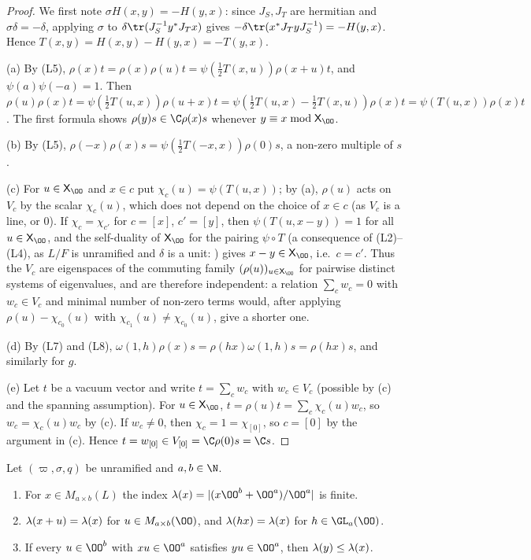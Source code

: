 \begin{proof}
We first note $\sigma H(x,y)=-H(y,x)$: since $J_S,J_T$ are hermitian and $\sigma\delta=-\delta$, applying $\sigma$ to
$\delta\tr(J_S^{-1}y^*J_Tx)$ gives $-\delta\tr(x^*J_TyJ_S^{-1})=-H(y,x)$. Hence $T(x,y)=H(x,y)-H(y,x)=-T(y,x)$.

(a) By (L5), $\rho(x)t=\rho(x)\rho(u)t=\psi(\frac12T(x,u))\rho(x+u)t$, and $\psi(a)\psi(-a)=1$. Then
$\rho(u)\rho(x)t=\psi(\frac12T(u,x))\rho(u+x)t=\psi(\frac12T(u,x)-\frac12T(x,u))\rho(x)t=\psi(T(u,x))\rho(x)t$. The first formula shows
$\rho(y)s\in\C\rho(x)s$ whenever $y\equiv x\bmod\shmiscXO$.

(b) By (L5), $\rho(-x)\rho(x)s=\psi(\frac12T(-x,x))\rho(0)s$, a non-zero multiple of $s$.

(c) For $u\in\shmiscXO$ and $x\in c$ put $\chi_c(u)=\psi(T(u,x))$; by (a), $\rho(u)$ acts on $V_c$ by the scalar $\chi_c(u)$, which does not
depend on the choice of $x\in c$ (as $V_c$ is a line, or $0$). If $\chi_c=\chi_{c'}$ for $c=[x]$, $c'=[y]$, then $\psi(T(u,x-y))=1$ for all
$u\in\shmiscXO$, and the self-duality of $\shmiscXO$ for the pairing $\psi\circ T$ (a consequence of (L2)--(L4), as $L/F$ is unramified
and $\delta$ is a unit: ) gives $x-y\in\shmiscXO$, i.e.\ $c=c'$. Thus the $V_c$ are eigenspaces of
the commuting family $(\rho(u))_{u\in\shmiscXO}$ for pairwise distinct systems of eigenvalues, and are therefore independent: a relation
$\sum_cw_c=0$ with $w_c\in V_c$ and minimal number of non-zero terms would, after applying $\rho(u)-\chi_{c_0}(u)$ with $\chi_{c_1}(u)\ne
\chi_{c_0}(u)$, give a shorter one.

(d) By (L7) and (L8), $\omega(1,h)\rho(x)s=\rho(hx)\omega(1,h)s=\rho(hx)s$, and similarly for $g$.

(e) Let $t$ be a vacuum vector and write $t=\sum_cw_c$ with $w_c\in V_c$ (possible by (c) and the spanning assumption). For
$u\in\shmiscXO$, $t=\rho(u)t=\sum_c\chi_c(u)w_c$, so $w_c=\chi_c(u)w_c$ by (c). If $w_c\ne0$, then $\chi_c=1=\chi_{[0]}$, so $c=[0]$ by the
argument in (c). Hence $t=w_{[0]}\in V_{[0]}=\C\rho(0)s=\C s$.
\end{proof}

\begin{lemma}\label{pf:sh-misc:latidx}
Let $(\varpi,\sigma,q)$ be unramified and $a,b\in\N$.
\begin{enumerate}[label=(\alph*)]
\item For $x\in M_{a\times b}(L)$ the index $\shmiscla(x)=|(x\OO^b+\OO^a)/\OO^a|$ is finite.
\item $\lambda(x+u)=\lambda(x)$ for $u\in M_{a\times b}(\OO)$, and $\lambda(hx)=\lambda(x)$ for $h\in\GL_a(\OO)$.
\item If every $u\in\OO^b$ with $xu\in\OO^a$ satisfies $yu\in\OO^a$, then $\lambda(y)\le\lambda(x)$.
\end{enumerate}
\end{lemma}

